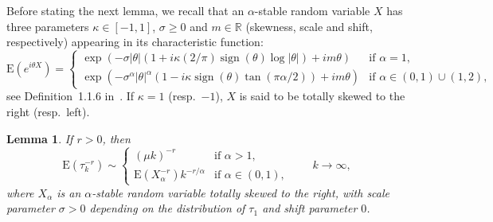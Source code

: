 \documentclass[11pt]{article}
\newtheorem{lemm}[theo]{Lemma}
\theoremstyle{definition}
\numberwithin{equation}{section}
\numberwithin{figure}{section}
\numberwithin{table}{section}
\DeclareMathOperator{\sign}{sign}
\newcommand{\bbR}{{\ensuremath{\mathbb R}}}
\newcommand{\ga}{\alpha}
\newcommand{\gs}{\sigma}
\newcommand\bE{\ensuremath{\mathrm{E}}}
\begin{document}
Before stating the next lemma, we recall that an $\ga$-stable random variable $X$ has three parameters $\kappa\in[-1,1]$, $\sigma\ge 0$ and $m\in \bbR$ (skewness, scale and shift, respectively) appearing in its characteristic function:
\begin{equation} \label{eq:stable.cf}
\bE(e^{i\theta X}) =
\begin{cases}
\exp(-\sigma |\theta| (1 + i\kappa (2/\pi) \sign(\theta) \log|\theta|) + im\theta) & \text{if }\ga = 1,\\[4pt]
\exp(-\sigma^\ga |\theta|^\ga (1 - i\kappa \sign(\theta) \tan(\pi \ga /2)) + im\theta) & \text{if } \ga\in(0, 1)\cup(1,2),
\end{cases}
\end{equation} see Definition~1.1.6 in~\cite{ST94}. If $\kappa =1$ (resp.\ $-1$), $X$ is said to be totally skewed to the right (resp.\ left).

\begin{lemm}\label{lem:conv.power.tauk}
If $r > 0$, then
\begin{equation}
\bE(\tau_k^{- r}) \sim
\begin{cases}
(\mu k)^{- r} & \text{if } \ga > 1,\\[4pt]
\bE(X_\ga^{- r}) k^{- r/\ga} & \text{if } \ga \in (0,1),
\end{cases}
\qquad k \to \infty,
\end{equation}
where $X_\ga$ is an $\ga$-stable random variable totally skewed to the right, with scale parameter $\gs > 0$ depending on the distribution of $\tau_1$ and shift parameter $0$.
\end{lemm}
\end{document}
